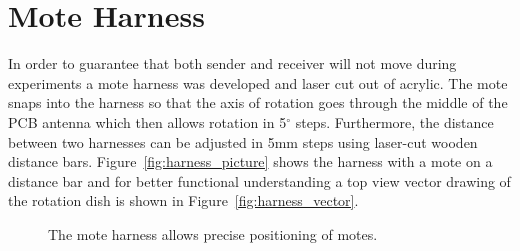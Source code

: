 \section{Mote Harness}

In order to guarantee that both sender and receiver will not move during experiments a mote harness was developed and laser cut out of acrylic.
The mote snaps into the harness so that the axis of rotation goes through the middle of the PCB antenna which then allows rotation in 5$^\circ$ steps.
Furthermore, the distance between two harnesses can be adjusted in 5mm steps using laser-cut wooden distance bars.
Figure~\ref{fig:harness_picture} shows the harness with a mote on a distance bar and for better functional understanding a top view vector drawing of the rotation dish is shown in Figure~\ref{fig:harness_vector}.

\begin{figure}[ht]
	\caption{The mote harness allows precise positioning of motes.}
	\label{fig:8mote_bit_errors_simulation}
\end{figure}


